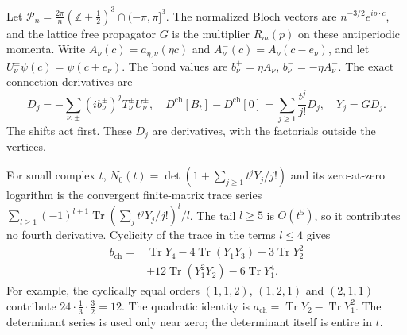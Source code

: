 \documentclass[11pt,letterpaper,reqno]{amsart}
\newcommand{\Z}{\mathbb Z}
\begin{document}
Let $\mathcal P_n=\frac{2\pi}{n}(\Z+\frac12)^3\cap(-\pi,\pi]^3$.
The normalized Bloch vectors are $n^{-3/2}e^{ip\cdot c}$,
and the lattice free propagator $G$ is the multiplier
$R_m(p)$ on these antiperiodic momenta. Write
$A_\nu(c)=a_{\eta,\nu}(\eta c)$ and
$A_\nu^-(c)=A_\nu(c-e_\nu)$, and let
$U_\nu^\pm\psi(c)=\psi(c\pm e_\nu)$. The bond values are
$b_\nu^+=\eta A_\nu$, $b_\nu^-=-\eta A_\nu^-$.
The exact connection derivatives are
\begin{equation}\label{eq:response-connection-derivatives}
 D_j=-\sum_{\nu,\pm}(ib_\nu^\pm)^jT_\nu^\pm U_\nu^\pm,
 \quad D^{\mathrm{ch}}[B_t]-D^{\mathrm{ch}}[0]
                  =\sum_{j\ge1}\frac{t^j}{j!}D_j,
 \quad Y_j=GD_j.
\end{equation}
The shifts act first. These $D_j$ are derivatives, with
the factorials outside the vertices.

For small complex $t$, $N_0(t)=\det(1+\sum_{j\ge1}t^jY_j/j!)$
and its zero-at-zero logarithm is the convergent finite-matrix
trace series $\sum_{l\ge1}(-1)^{l+1}\operatorname{Tr}(\sum_j
t^jY_j/j!)^l/l$. The tail $l\ge5$ is $O(t^5)$, so it
contributes no fourth derivative. Cyclicity of the trace
in the terms $l\le4$ gives
\begin{equation}\label{eq:response-fourth-identity}
 \begin{split}
 b_{\mathrm{ch}}={}&\operatorname{Tr}Y_4
       -4\operatorname{Tr}(Y_1Y_3)-3\operatorname{Tr}Y_2^2\\
       &+12\operatorname{Tr}(Y_1^2Y_2)-6\operatorname{Tr}Y_1^4.
 \end{split}
\end{equation}
For example, the cyclically equal orders $(1,1,2)$,
$(1,2,1)$ and $(2,1,1)$ contribute
$24\cdot\frac13\cdot\frac32=12$. The quadratic identity
is $a_{\mathrm{ch}}=\operatorname{Tr}Y_2-\operatorname{Tr}Y_1^2$.
The determinant series is used only near zero; the determinant
itself is entire in $t$.
\end{document}
